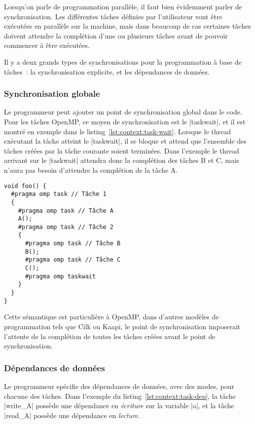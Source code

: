 Lorsqu'on parle de programmation parallèle, il faut bien évidemment parler de synchronisation.
Les différentes tâches définies par l'utilisateur vont être exécutées en parallèle sur la machine, mais dans beaucoup de cas certaines tâches doivent attendre la complétion d'une ou plusieurs tâches avant de pouvoir commencer à être exécutées.

Il y a deux grands types de synchronisations pour la programmation à base de tâches~: la synchronisation explicite, et les dépendances de données.

\subsubsection{Synchronisation globale}

Le programmeur peut ajouter un point de synchronisation global dans le code.
Pour les tâches OpenMP, ce moyen de synchronisation est le |taskwait|, et il est montré en exemple dans le listing~\ref{lst:context:task-wait}.
Lorsque le thread exécutant la tâche atteint le |taskwait|, il se bloque et attend que l'ensemble des tâches créées par la tâche courante soient terminées.
Dans l'exemple le thread arrivant sur le |taskwait| attendra donc la complétion des tâches B et C, mais n'aura pas besoin d'attendre la complétion de la tâche A.

\begin{lstlisting}[caption=Synchronisation dans le thread courant (OpenMP),label=lst:context:task-wait]
void foo() {
  #pragma omp task // Tâche 1
  {
    #pragma omp task // Tâche A
    A();
    #pragma omp task // Tâche 2
    {
      #pragma omp task // Tâche B
      B();
      #pragma omp task // Tâche C
      C();
      #pragma omp taskwait
    }
  }
}
\end{lstlisting}

Cette sémantique est particulière à OpenMP, dans d'autres modèles de programmation tels que Cilk ou Kaapi, le point de synchronisation imposerait l'attente de la complétion de toutes les tâches créées avant le point de synchronisation.


\subsubsection{Dépendances de données}

Le programmeur spécifie des dépendances de données, avec des modes, pour chacune des tâches.
Dans l'exemple du listing~\ref{lst:context:task-dep}, la tâche |write_A| possède une dépendance en \emph{écriture} sur la variable |a|, et la tâche |read_A| possède une dépendance en \emph{lecture}.

